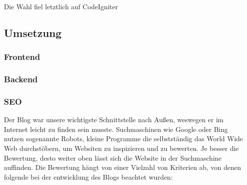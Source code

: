     Die Wahl fiel letztlich auf CodeIgniter
  \subsection{Umsetzung}

    \subsubsection{Frontend}

    \subsubsection{Backend}

    \subsubsection{SEO}
    Der Blog war unsere wichtigste Schnittstelle nach Außen, weswegen er im Internet leicht zu finden sein musste. Suchmaschinen wie Google oder Bing nutzen
    sogenannte Robots, kleine Programme die selbstständig das World Wide Web durchstöbern, um Websiten zu inspizieren und zu bewerten. Je besser die Bewertung,
    desto weiter oben lässt sich die Website in der Suchmaschine auffinden.
    Die Bewertung hängt von einer Vielzahl von Kriterien ab, von denen folgende bei der entwicklung des Blogs beachtet wurden:
